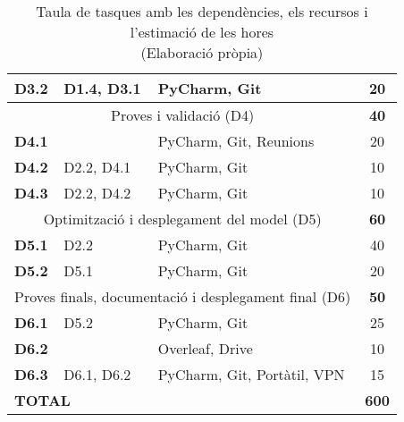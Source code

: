 {{\begin{table}[H]
\begin{tabular}{|cllc|}
    \multicolumn{1}{|l|}{\textbf{D3.2}}         & \multicolumn{1}{l|}{D1.4, D3.1}                      & \multicolumn{1}{l|}{PyCharm, Git}        & 20                       \\ \hline
                                                \multicolumn{3}{|c|}{Proves i validació (D4)}                                       & \textbf{40}              \\ \hline
    \multicolumn{1}{|l|}{\textbf{D4.1}}         & \multicolumn{1}{l|}{}                      & \multicolumn{1}{l|}{PyCharm, Git, Reunions}                  & 20                       \\ \hline
    \multicolumn{1}{|l|}{\textbf{D4.2}}         & \multicolumn{1}{l|}{D2.2, D4.1}                      & \multicolumn{1}{l|}{PyCharm, Git}        & 10                       \\ \hline
    \multicolumn{1}{|l|}{\textbf{D4.3}}         & \multicolumn{1}{l|}{D2.2, D4.2}                      & \multicolumn{1}{l|}{PyCharm, Git}        & 10                       \\ \hline
                                                \multicolumn{3}{|c|}{Optimització i desplegament del model (D5)}                    & \textbf{60}              \\ \hline
    \multicolumn{1}{|l|}{\textbf{D5.1}}         & \multicolumn{1}{l|}{D2.2}                      & \multicolumn{1}{l|}{PyCharm, Git}              & 40                       \\ \hline
    \multicolumn{1}{|l|}{\textbf{D5.2}}         & \multicolumn{1}{l|}{D5.1}                      & \multicolumn{1}{l|}{PyCharm, Git}              & 20                       \\ \hline
                                                \multicolumn{3}{|c|}{Proves finals, documentació i desplegament final (D6)}                & \textbf{50}              \\ \hline
    \multicolumn{1}{|l|}{\textbf{D6.1}}         & \multicolumn{1}{l|}{D5.2}                      & \multicolumn{1}{l|}{PyCharm, Git}              & 25                       \\ \hline
    \multicolumn{1}{|l|}{\textbf{D6.2}}         & \multicolumn{1}{l|}{}                      & \multicolumn{1}{l|}{Overleaf, Drive}                  & 10                       \\ \hline
    \multicolumn{1}{|l|}{\textbf{D6.3}}         & \multicolumn{1}{l|}{D6.1, D6.2}                      & \multicolumn{1}{l|}{PyCharm, Git, Portàtil, VPN}        & 15                       \\ \hline
    \hline
    \multicolumn{3}{|l|}{\textbf{TOTAL}}                & \textbf{600}              \\ \hline
    \end{tabular}
    \caption[Taula de tasques]{Taula de tasques amb les dependències, els recursos i l'estimació de les hores \\ (Elaboració pròpia)}
    \label{fig:taula_tasques}
\end{table}
}
}
